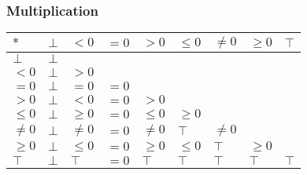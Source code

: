 \documentclass[aspectratio=169]{beamer}
\begin{document}
    \begin{frame}
        \frametitle{Multiplication}
        \begin{table}[]
            \begin{tabular}{|l|l|l|l|l|l|l|l|l|}
            \hline
            $*$     & $\bot$ & $<0$    & $=0$ & $>0$    & $\le 0$ & $\ne 0$ & $\ge 0$ & $\top$ \\ \hline
            $\bot$  & $\bot$ &         &      &         &         &         &         &        \\ \hline
            $<0$    & $\bot$ & $>0$    &      &         &         &         &         &        \\ \hline
            $=0$    & $\bot$ & $=0$    & $=0$ &         &         &         &         &        \\ \hline
            $>0$    & $\bot$ & $<0$    & $=0$ & $>0$    &         &         &         &        \\ \hline
            $\le 0$ & $\bot$ & $\ge 0$ & $=0$ & $\le 0$ & $\ge 0$ &         &         &        \\ \hline
            $\ne 0$ & $\bot$ & $\ne 0$ & $=0$ & $\ne 0$ & $\top$  & $\ne 0$ &         &        \\ \hline
            $\ge 0$ & $\bot$ & $\le 0$ & $=0$ & $\ge 0$ & $\le 0$ & $\top$  & $\ge 0$ &        \\ \hline
            $\top$  & $\bot$ & $\top$  & $=0$ & $\top$  & $\top$  & $\top$  & $\top$  & $\top$ \\ \hline
            \end{tabular}
            \end{table}
        \end{frame}
\end{document}
